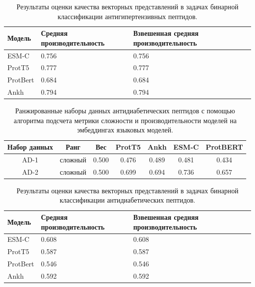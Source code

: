 \documentclass[specification,annotation,times]{itmo-student-thesis}
\begin{document}
\begin{table}[h]
\centering

\caption{Результаты оценки качества векторных представлений в задачах бинарной классификации антигипертензивных пептидов.}
\label{tab:compare_results_aht}
\begin{tabular}{|p{3cm}|p{5cm}|p{5cm}|}
\hline
Модель & Средняя \newline производительность & Взвешенная \newline средняя \newline производительность \\
\hline
ESM-C & 0.756 & 0.756 \\ \hline
ProtT5 & 0.777 & 0.777 \\ \hline
ProtBert & 0.684 & 0.684 \\ \hline
Ankh & 0.794 & 0.794 \\ \hline
\end{tabular}

\end{table}

\begin{table}[h]
\centering
\caption{Ранжированные наборы данных антидиабетических пептидов с помощью алгоритма подсчета метрики сложности и производительности моделей на эмбеддингах языковых моделей.}
\label{tab:model_performance_ad}

\begin{tabular}{|c|c|c|c|c|c|c|}
\hline
Набор данных & Ранг & Вес & ProtT5 & Ankh & ESM-C & ProtBERT \\
\hline
AD-1 & сложный & 0.500 & 0.476 & 0.489 & 0.481 & 0.434 \\ \hline
AD-2 & сложный & 0.500 & 0.699 & 0.694 & 0.736 & 0.657 \\ \hline
\end{tabular}

\end{table}


\begin{table}[h]
\centering

\caption{Результаты оценки качества векторных представлений в задачах бинарной классификации антидиабетических пептидов.}
\label{tab:compare_results_ad}
\begin{tabular}{|p{3cm}|p{5cm}|p{5cm}|}
\hline
Модель & Средняя \newline производительность & Взвешенная \newline средняя \newline производительность \\
\hline
ESM-C & 0.608 & 0.608 \\ \hline
ProtT5 & 0.587 & 0.587 \\ \hline
ProtBert & 0.546 & 0.546 \\ \hline
Ankh & 0.592 & 0.592 \\ \hline

\end{tabular}

\end{table}
\end{document}
